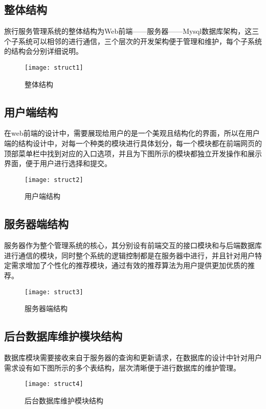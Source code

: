 \subsection{整体结构}
旅行服务管理系统的整体结构为Web前端——服务器——Mysql数据库架构，这三个子系统可以相邻的进行通信，三个层次的开发架构便于管理和维护，每个子系统的结构会分别详细说明。
\begin{figure}[htbp]
\texttt{[image: struct1]}
\caption{整体结构} \label{fig:figure5}
\end{figure}

\subsection{用户端结构}
在web前端的设计中，需要展现给用户的是一个美观且结构化的界面，所以在用户端的结构设计中，对每一个种类的模块进行具体划分，每一个模块都在前端网页的顶部菜单栏中找到对应的入口选项，并且为下图所示的模块都独立开发操作和展示界面，便于用户进行选择和提交。
\begin{figure}[htbp]
\texttt{[image: struct2]}
\caption{用户端结构} \label{fig:figure6}
\end{figure}

\subsection{服务器端结构}
服务器作为整个管理系统的核心，其分别设有前端交互的接口模块和与后端数据库进行通信的模块，同时整个系统的逻辑控制都是在服务器中进行，并且针对用户特定需求增加了个性化的推荐模块，通过有效的推荐算法为用户提供更加优质的推荐。
\begin{figure}[htbp]
\texttt{[image: struct3]}
\caption{服务器端结构} \label{fig:figure7}
\end{figure}

\subsection{后台数据库维护模块结构}
数据库模块需要接收来自于服务器的查询和更新请求，在数据库的设计中针对用户需求设有如下图所示的多个表结构，层次清晰便于进行数据库的维护管理。
\begin{figure}[htbp]
\texttt{[image: struct4]}
\caption{后台数据库维护模块结构} \label{fig:figure8}
\end{figure}


